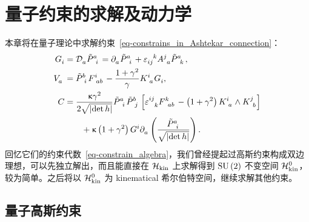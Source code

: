 
\chapter{量子约束的求解及动力学}

	本章将在量子理论中求解约束~\eqref{eq-constrains_in_Ashtekar_connection}：
	\begin{equation*}
		\begin{split}
			\tensor{G}{_i} &= \AD{a} \tensor{\tilde{P}}{^a_i} = \Partial{a} \tensor{\tilde{P}}{^a_i} + \tensor{\vol}{_i_j^k} \tensor{A}{^j_a} \tensor{\tilde{P}}{^a_k},\\
			\tensor{V}{_a} &= \tensor{\tilde{P}}{^b_i} \tensor{F}{^i_a_b} - \frac{1+\gamma^2}{\gamma} \tensor{K}{^i_a} \tensor{G}{_i},\\
			C &= \frac{\gkappa \gamma^2}{2\sqrt{\abs{\det h}}} \tensor{\tilde{P}}{^a_i} \tensor{\tilde{P}}{^b_j} \left[ \tensor{\vol}{^i^j_k} \tensor{F}{^k_a_b} - \left( 1+ \gamma^2 \right) \tensor{K}{^i_a} \wedge \tensor{K}{^j_b} \right]\\
			& \qquad + \gkappa \left( 1 +\gamma^2 \right) \tensor{G}{^i} \Partial{a} \left( \frac{\tensor{\tilde{P}}{^a_i}}{\sqrt{\abs{\det h}}} \right).
		\end{split}
	\end{equation*}
	回忆它们的约束代数~\eqref{eq-constrain_algebra}，我们曾经提起过高斯约束构成双边理想，可以先独立解出，而且能直接在 $\mathcal{H}_{\text{kin}}$ 上求解得到 $\mathrm{SU}\left(2\right)$ 不变空间 $\mathcal{H}_{\text{kin}}^0$，较为简单。之后将以 $\mathcal{H}_{\text{kin}}^0$ 为 kinematical 希尔伯特空间，继续求解其他约束。

	\section{量子高斯约束}

